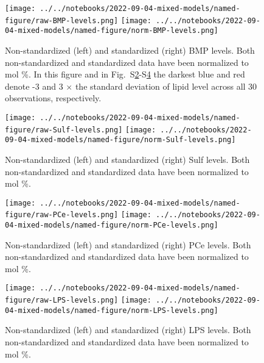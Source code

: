 \documentclass[letterpaper]{article}
\begin{document}
\setcounter{figure}{0}
\makeatletter 
\renewcommand{\figurename}{Supplementary Figure} %
\makeatother

\begin{figure}[p]
	\texttt{[image: ../../notebooks/2022-09-04-mixed-models/named-figure/raw-BMP-levels.png]}
	\texttt{[image: ../../notebooks/2022-09-04-mixed-models/named-figure/norm-BMP-levels.png]}
	\caption[Non-standardized and standardized BMP levels]{
	Non-standardized (left) and standardized (right) BMP levels.  Both
	non-standardized and standardized data have been normalized to mol \%.  In
	this figure and in Fig.~S\ref{fig:heatmap-Sulf}-S\ref{fig:heatmap-LPS} the
	darkest blue and red denote -3 and 3 $\times$ the standard deviation of
	lipid level across all 30 observations, respectively.
}
\label{fig:heatmap-BMP}
\end{figure}

\begin{figure}[p]
	\texttt{[image: ../../notebooks/2022-09-04-mixed-models/named-figure/raw-Sulf-levels.png]}
	\texttt{[image: ../../notebooks/2022-09-04-mixed-models/named-figure/norm-Sulf-levels.png]}
	\caption[Raw and standardized Sulf levels]{
	Non-standardized (left) and standardized (right) Sulf levels.  Both
	non-standardized and standardized data have been normalized to mol \%.  
}
\label{fig:heatmap-Sulf}
\end{figure}

\begin{figure}[p]
	\texttt{[image: ../../notebooks/2022-09-04-mixed-models/named-figure/raw-PCe-levels.png]}
	\texttt{[image: ../../notebooks/2022-09-04-mixed-models/named-figure/norm-PCe-levels.png]}
	\caption[Raw and standardized PCe levels]{
	Non-standardized (left) and standardized (right) PCe levels.  Both
	non-standardized and standardized data have been normalized to mol \%.  
}
\label{fig:heatmap-PCe}
\end{figure}

\begin{figure}[p]
	\texttt{[image: ../../notebooks/2022-09-04-mixed-models/named-figure/raw-LPS-levels.png]}
	\texttt{[image: ../../notebooks/2022-09-04-mixed-models/named-figure/norm-LPS-levels.png]}
	\caption[Raw and standardized LPS levels]{
	Non-standardized (left) and standardized (right) LPS levels.  Both
	non-standardized and standardized data have been normalized to mol \%.  
}
\label{fig:heatmap-LPS}
\end{figure}
\end{document}
